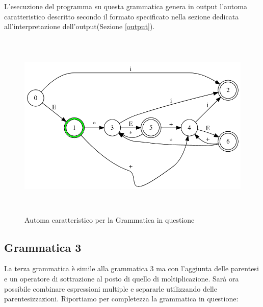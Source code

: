 \documentclass[12pt]{article}
\begin{document}
L'esecuzione del programma su questa grammatica genera in output l'automa caratteristico descritto secondo il formato specificato nella sezione dedicata all'interpretazione dell'output(Sezione \ref{output}).

\begin{figure}[h]
  \includegraphics[height=9cm, keepaspectratio]{assets/automa2.png}
  \caption{Automa caratteristico per la Grammatica in questione}
  \label{fig:automa1}
\end{figure}


\subsection{Grammatica 3}
La terza grammatica è simile alla grammatica 3 ma con l'aggiunta delle parentesi e un operatore di sottrazione al posto di quello di moltiplicazione. Sarà ora possibile combinare espressioni multiple e separarle utilizzando delle parentesizzazioni. Riportiamo per completezza la grammatica in questione:

\end{document}
